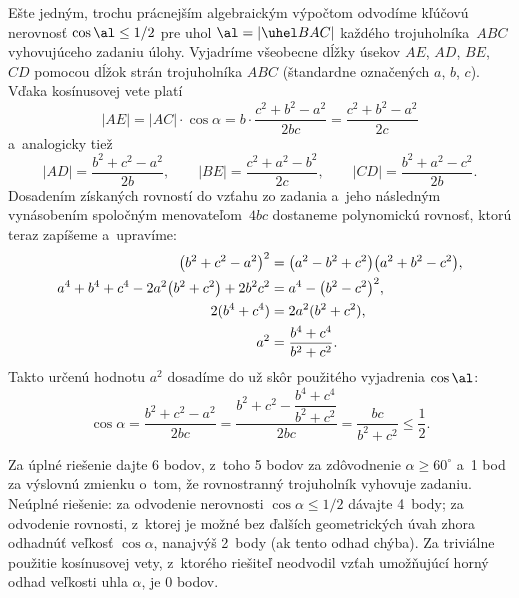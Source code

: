 {\ineriesenie
Ešte jedným, trochu prácnejším algebraickým výpočtom odvodíme
kľúčovú nerovnosť $\cos \al\le1/2$ pre uhol $\al=|\uhel BAC|$
každého trojuholníka~$ABC$ vyhovujúceho zadaniu úlohy. Vyjadríme všeobecne
dĺžky úsekov $AE$, $AD$, $BE$, $CD$ pomocou dĺžok
strán trojuholníka $ABC$ (štandardne označených $a$, $b$, $c$).
Vďaka kosínusovej vete platí
$$
|AE| = |AC| \cdot \cos \alpha = b \cdot
\frac {c^2+b^2-a^2} {2bc} = \frac {c^2+b^2-a^2} {2c}
$$
a~analogicky tiež
$$
|AD| = \frac {b^2+c^2-a^2} {2b}, \qquad |BE| = \frac {c^2+a^2-b^2} {2c}, \qquad
|CD| = \frac {b^2+a^2-c^2} {2b}.
$$
Dosadením získaných rovností do vzťahu zo zadania a~jeho následným
vynásobením spoločným menovateľom~$4bc$ dostaneme polynomickú
rovnosť, ktorú teraz zapíšeme a~upravíme:
$$
\aligned
\bigl(b^2+c^2-a^2\bigr)^2&=\bigl(a^2-b^2+c^2\bigr)\bigl(a^2+b^2-c^2\bigr),\\
a^4+b^4+c^4-2a^2\bigl(b^2+c^2\bigr)+2b^2c^2&=a^4-\bigl(b^2-c^2\bigr)^2,\\
2(b^4+c^4)&=2a^2(b^2+c^2),\\
a^2&=\frac{b^4+c^4}{b^2+c^2}.
\endaligned
$$
Takto určenú hodnotu $a^2$ dosadíme do už skôr použitého
vyjadrenia $\cos\al$:
$$
\cos \alpha =
\frac {b^2+c^2-a^2} {2bc} = \frac {b^2+c^2- \dfrac {b^4+c^4} {b^2+c^2}} {2bc}
= \frac {bc} {b^2+c^2}
\leq \frac12.
$$


\nobreak\medskip\petit\noindent
Za úplné riešenie dajte 6 bodov, z~toho 5 bodov za
zdôvodnenie $\alpha \ge 60^\circ$ a~1 bod za výslovnú zmienku o~tom,
že rovnostranný trojuholník vyhovuje zadaniu.
Neúplné riešenie: za odvodenie nerovnosti $\cos \alpha \le 1/2$
dávajte 4~body; za odvodenie rovnosti, z~ktorej je možné bez
ďalších geometrických úvah zhora odhadnúť veľkosť
$\cos \alpha$, nanajvýš 2~body (ak tento odhad chýba). Za triviálne
použitie kosínusovej vety, z~ktorého riešiteľ neodvodil vzťah
umožňujúcí horný odhad veľkosti uhla $\alpha$, je 0 bodov.

\endpetit
\bigbreak
}

